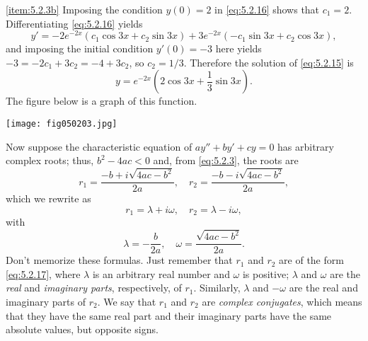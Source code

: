 \documentclass{ximera}
\begin{document}
\begin{example}
\begin{explanation}
\ref{item:5.2.3b}   Imposing the condition $y(0)=2$
in   \eqref{eq:5.2.16} shows that $c_1=2$.  Differentiating
\eqref{eq:5.2.16} yields
$$
y'=-2e^{-2x}(c_1\cos 3x+c_2\sin 3x) +3e^{-2x}(-c_1\sin 3x +c_2\cos 3x),
$$
and imposing the initial condition $y'(0)=-3$ here yields
$-3=-2c_1+3c_2=-4+3c_2$,
 so $c_2=1/3$. Therefore the solution of
\eqref{eq:5.2.15} is
$$
y=e^{-2x}(2\cos 3x+ \frac{1}{3}\sin 3x).
$$
The figure below is a graph of this function.
 
\begin{image}
 \texttt{[image: fig050203.jpg]}
 \end{image}
\end{explanation}
\end{example}
 
 
Now suppose   the characteristic equation of $ay''+by'+cy=0$ has
arbitrary complex roots;   thus, $b^2-4ac<0$ and, from \eqref{eq:5.2.3},
the
roots are
$$
r_1 = \frac{-b+i\sqrt{4ac-b^2}}{2a},\quad r_2 =
\frac{-b-i\sqrt{4ac-b^2}}{2a},
$$
which we rewrite as
\begin{equation} \label{eq:5.2.17}
r_1=\lambda+i \omega,\quad r_2 = \lambda - i \omega,
\end{equation}
 with
$$
\lambda = -\frac{b}{2a},\quad \omega = \frac{\sqrt{4ac-b^2}}{2a}.
$$
Don't memorize these formulas. Just remember that $r_1$
and $r_2$ are of the form \eqref{eq:5.2.17},
where  $\lambda$ is an arbitrary real number and $\omega$
is   positive;
 $\lambda$ and $\omega$ are  the \textit{real}
and \textit{imaginary parts}, respectively, of $r_1$.
Similarly, $\lambda$ and $-\omega$ are the real and imaginary parts of
$r_2$. We say that $r_1$ and $r_2$ are \textit{complex conjugates},
which means that they have the same real part and their imaginary
parts have the same absolute values, but opposite signs.
 
\end{document}
